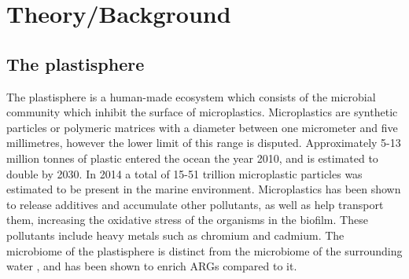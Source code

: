 \chapter{Theory/Background}


% 

\section{The plastisphere}
The plastisphere is a human-made ecosystem which consists of the microbial community which inhibit the surface of microplastics\cite{amaralzettler2020EcologyPlastisphere}. 
Microplastics are synthetic particles or polymeric matrices with a diameter between one micrometer and five millimetres, however the lower limit of this range is disputed\cite{frias2019MicroplasticsFindingConsensus}.
Approximately 5-13 million tonnes of plastic entered the ocean the year 2010, and is estimated to double by 2030\cite{amaralzettler2020EcologyPlastisphere}. In 2014 a total of 15-51 trillion microplastic particles was estimated to be present in the marine environment\cite{vansebille2015GlobalInventorySmall}.
Microplastics has been shown to release additives and accumulate other pollutants, as well as help transport them, increasing the oxidative stress of the organisms in the biofilm. These pollutants include heavy metals such as chromium and cadmium\cite{forero-lopez2022PlastisphereMicroplasticsSitu}.
The microbiome of the plastisphere is distinct from the microbiome of the surrounding water \cite{zadjelovic2023MicrobialHitchhikersHarbouring}, and has been shown to enrich ARGs compared to it\cite{zhou2024MicroplasticBiofilmsPromote}.


